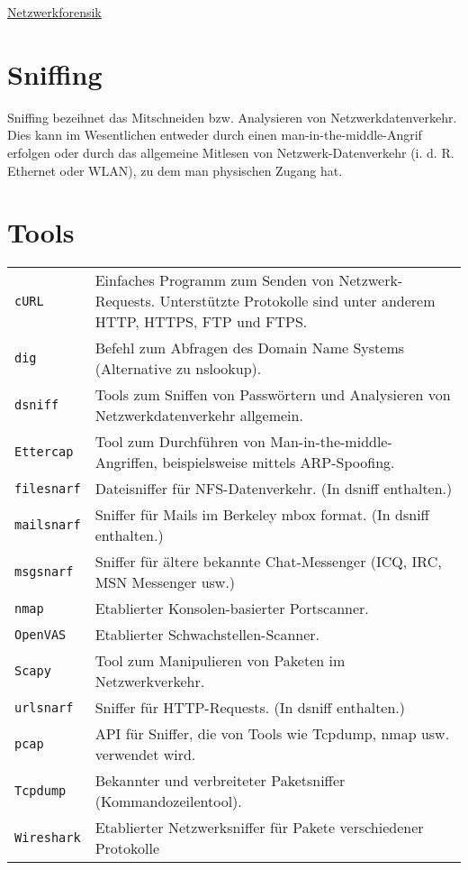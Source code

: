\raggedright
\footnotesize
\begin{multicols}{3}	
	\setlength{\premulticols}{1pt}
	\setlength{\postmulticols}{1pt}
	\setlength{\multicolsep}{1pt}
	\setlength{\columnsep}{2pt}

\begin{center}
     \Large{\underline{Netzwerkforensik}} \\
\end{center}

\section{Sniffing}
Sniffing bezeihnet das Mitschneiden bzw. Analysieren von Netzwerkdatenverkehr. Dies kann im Wesentlichen entweder durch einen man-in-the-middle-Angrif erfolgen oder durch das allgemeine Mitlesen von Netzwerk-Datenverkehr (i. d. R. Ethernet oder WLAN), zu dem man physischen Zugang hat. 
\section{Tools}
\begin{tabular}{@{}p{\the\MyLen}
		@{}p{\linewidth-\the\MyLen}@{}}
	\texttt{cURL} & Einfaches Programm zum Senden von Netzwerk-Requests. Unterstützte Protokolle sind unter anderem HTTP, HTTPS, FTP und FTPS.\\
	\texttt{dig} & Befehl zum Abfragen des Domain Name Systems (Alternative zu nslookup).\\
	\texttt{dsniff} & Tools zum Sniffen von Passwörtern und Analysieren von Netzwerkdatenverkehr allgemein.\\
	\texttt{Ettercap} & Tool zum Durchführen von Man-in-the-middle-Angriffen, beispielsweise mittels ARP-Spoofing.\\
	\texttt{filesnarf} & Dateisniffer für NFS-Datenverkehr. (In dsniff enthalten.)\\
	\texttt{mailsnarf} & Sniffer für Mails im Berkeley mbox format. (In dsniff enthalten.)\\
	\texttt{msgsnarf} & Sniffer für ältere bekannte Chat-Messenger (ICQ, IRC, MSN Messenger usw.)\\
	\texttt{nmap} & Etablierter Konsolen-basierter Portscanner.\\
	\texttt{OpenVAS} & Etablierter Schwachstellen-Scanner.\\
	\texttt{Scapy} & Tool zum Manipulieren von Paketen im Netzwerkverkehr.\\
	\texttt{urlsnarf} & Sniffer für HTTP-Requests. (In dsniff enthalten.)\\
	\texttt{pcap} & API für Sniffer, die von Tools wie Tcpdump, nmap usw. verwendet wird.\\
	\texttt{Tcpdump} & Bekannter und verbreiteter Paketsniffer (Kommandozeilentool).\\
	\texttt{Wireshark} & Etablierter Netzwerksniffer für Pakete verschiedener Protokolle\\
\end{tabular}
\end{multicols}